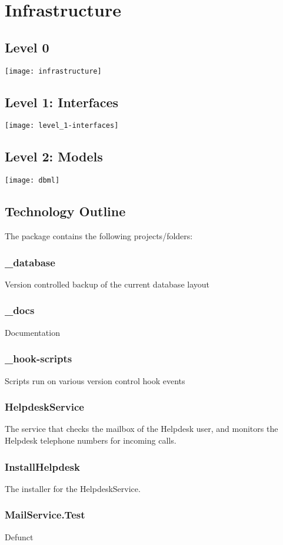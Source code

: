 \documentclass{article}
\begin{document}
\section{Infrastructure}
\subsection{Level 0}
\texttt{[image: infrastructure]}
\subsection{Level 1: Interfaces}
\texttt{[image: level\_1-interfaces]}
\subsection{Level 2: Models}
\texttt{[image: dbml]}
\subsection{Technology Outline}
The package contains the following projects/folders:
\subsubsection{\_database}
Version controlled backup of the current database layout
\subsubsection{\_docs}
Documentation
\subsubsection{\_hook-scripts}
Scripts run on various version control hook events
\subsubsection{HelpdeskService}
The service that checks the mailbox of the Helpdesk user, and monitors the Helpdesk telephone numbers for incoming calls.
\subsubsection{InstallHelpdesk}
The installer for the HelpdeskService.
\subsubsection{MailService.Test}
Defunct
\end{document}
